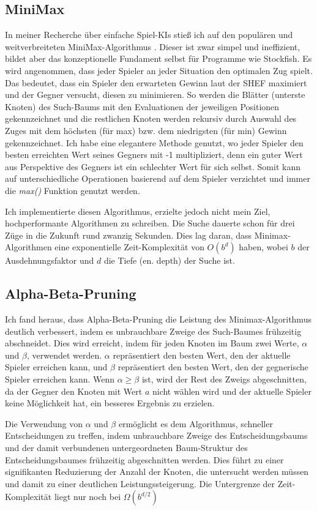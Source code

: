 \documentclass{jpp}
\begin{document}
\subsection{MiniMax}
In meiner Recherche über einfache Spiel-KIs stieß ich auf den populären und weitverbreiteten MiniMax-Algorithmus \cite{minimax}. Dieser ist zwar simpel und ineffizient, bildet aber das konzeptionelle Fundament selbst für Programme wie Stockfish.
Es wird angenommen, dass jeder Spieler an jeder Situation den optimalen Zug spielt. Das bedeutet, dass ein Spieler den erwarteten Gewinn laut der SHEF maximiert und der Gegner versucht, diesen zu minimieren. So werden die Blätter (unterste Knoten) des Such-Baums mit den Evaluationen der jeweiligen Positionen gekennzeichnet und die restlichen Knoten werden rekursiv durch Auswahl des Zuges mit dem höchsten (für max) bzw. dem niedrigsten (für min) Gewinn gekennzeichnet. Ich habe eine elegantere Methode genutzt, wo jeder Spieler den besten erreichten Wert seines Gegners mit -1 multipliziert, denn ein guter Wert aus Perspektive des Gegners ist ein schlechter Wert für sich selbst. Somit kann auf unterschiedliche Operationen basierend auf dem Spieler verzichtet und immer die \textit{max()} Funktion genutzt werden.

Ich implementierte diesen Algorithmus, erzielte jedoch nicht mein Ziel, hochperformante Algorithmen zu schreiben. Die Suche dauerte schon für drei Züge in die Zukunft rund zwanzig Sekunden. Dies lag daran, dass Minimax-Algorithmen eine exponentielle Zeit-Komplexität von $O(b^d)$ haben, wobei $b$ der Ausdehnungsfaktor und $d$ die Tiefe (en. depth) der Suche ist.

\subsection{Alpha-Beta-Pruning}
Ich fand heraus, dass Alpha-Beta-Pruning \cite{abp} die Leistung des Minimax-Algorithmus deutlich verbessert, indem es unbrauchbare Zweige des Such-Baumes frühzeitig abschneidet. Dies wird erreicht, indem für jeden Knoten im Baum zwei Werte, $\alpha$ und $\beta$, verwendet werden. $\alpha$ repräsentiert den besten Wert, den der aktuelle Spieler erreichen kann, und $\beta$ repräsentiert den besten Wert, den der gegnerische Spieler erreichen kann. Wenn $\alpha \geq \beta$ ist, wird der Rest des Zweigs abgeschnitten, da der Gegner den Knoten mit Wert $a$ nicht wählen wird und der aktuelle Spieler keine Möglichkeit hat, ein besseres Ergebnis zu erzielen.

Die Verwendung von $\alpha$ und $\beta$ ermöglicht es dem Algorithmus, schneller Entscheidungen zu treffen, indem unbrauchbare Zweige des Entscheidungsbaums und der damit verbundenen untergeordneten Baum-Struktur des Entscheidungsbaumes frühzeitig abgeschnitten werden. Dies führt zu einer signifikanten Reduzierung der Anzahl der Knoten, die untersucht werden müssen und damit zu einer deutlichen Leistungssteigerung. Die Untergrenze der Zeit-Komplexität liegt nur noch bei $\Omega(b^{d/2})$
\end{document}
